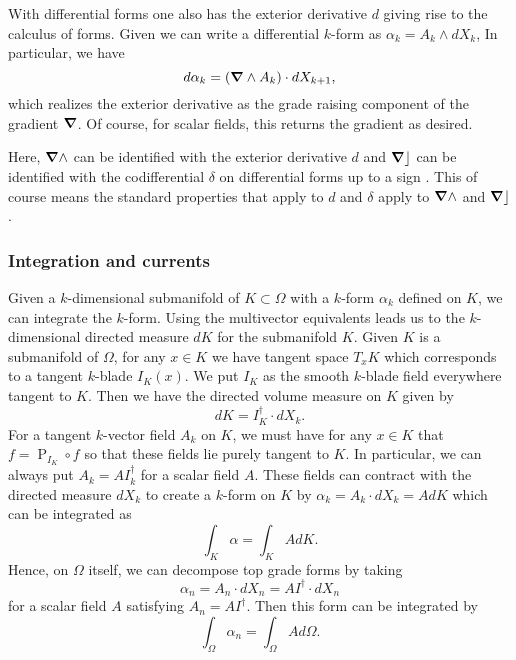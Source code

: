 With differential forms one also has the exterior derivative $d$ giving rise to the calculus of forms.  Given we can write a differential $k$-form as $\alpha_k = A_k \wedge dX_k$,  In particular, we have
\[
d \alpha_k = (\boldsymbol{\nabla} \wedge A_k) \cdot dX_{k+1},
\]
which realizes the exterior derivative as the grade raising component of the gradient $\boldsymbol{\nabla}$. Of course, for scalar fields, this returns the gradient as desired. 

Here, $\boldsymbol{\nabla} \wedge$ can be identified with the exterior derivative $d$ and $\boldsymbol{\nabla} \rfloor$ can be identified with the codifferential $\delta$ on differential forms up to a sign \cite{schindler_geometric_2020}. This of course means the standard properties that apply to $d$ and $\delta$ apply to $\boldsymbol{\nabla} \wedge$ and $\boldsymbol{\nabla} \rfloor$.


\subsubsection{Integration and currents}
\label{subsubsec:integration_on_submanifolds}
Given a $k$-dimensional submanifold of $K \subset \Omega$ with a $k$-form $\alpha_k$ defined on $K$, we can integrate the $k$-form. Using the multivector equivalents leads us to the $k$-dimensional directed measure $dK$ for the submanifold $K$.  Given $K$ is a submanifold of $\Omega$, for any $x \in K$ we have tangent space $T_x K$ which corresponds to a tangent $k$-blade $I_K(x)$.  We put $I_K$ as the smooth $k$-blade field everywhere tangent to $K$. Then we have the directed volume measure on $K$ given by
\[
dK = I_K^\dagger \cdot dX_k.
\]
For a tangent $k$-vector field $A_k$ on $K$, we must have for any $x \in K$ that $f = \operatorname{P}_{I_K} \circ f$ so that these fields lie purely tangent to $K$. In particular, we can always put $A_k = A I_k^\dagger$ for a scalar field $A$. These fields can contract with the directed measure $dX_k$ to create a $k$-form on $K$ by $\alpha_k = A_k \cdot dX_k = A dK$ which can be integrated as
\[
\int_K \alpha = \int_K A dK.
\]
Hence, on $\Omega$ itself, we can decompose top grade forms by taking
\[
\alpha_n = A_n \cdot dX_n = A I^\dagger \cdot dX_n
\]
for a scalar field $A$ satisfying $A_n = AI^\dagger$. Then this form can be integrated by
\[
\int_\Omega \alpha_n = \int_\Omega A d\Omega.
\]


